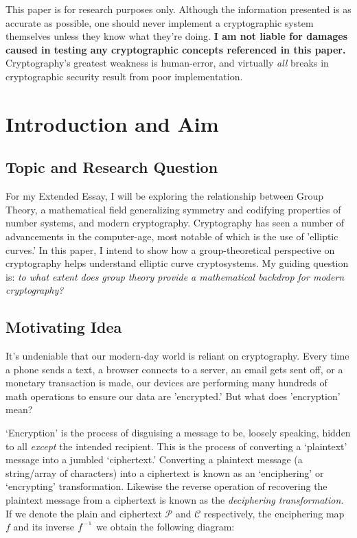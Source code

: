 \documentclass[11pt, a4paper]{report}
\newcommand{\inv}{^{\raisebox{.2em}{$\scriptscriptstyle-1$}}}
\begin{document}
This paper is for research purposes only. Although the information presented is as accurate as possible, one should never implement a cryptographic system themselves unless they know what they're doing. \textbf{I am not liable for damages caused in testing any cryptographic concepts referenced in this paper.} Cryptography's greatest weakness is human-error, and virtually \textit{all} breaks in cryptographic security result from poor implementation.\autocite{thimbleby}

\section{Introduction and Aim}
\subsection{Topic and Research Question}

For my Extended Essay, I will be exploring the relationship between Group Theory, a mathematical field generalizing symmetry and codifying properties of number systems, and modern cryptography. Cryptography has seen a number of advancements in the computer-age, most notable of which is the use of 'elliptic curves.' In this paper, I intend to show how a group-theoretical perspective on cryptography helps understand elliptic curve cryptosystems. My guiding question is: \textit{to what extent does group theory provide a mathematical backdrop for modern cryptography?}

\subsection{Motivating Idea}
It's undeniable that our modern-day world is reliant on cryptography. Every time a phone sends a text, a browser connects to a server, an email gets sent off, or a monetary transaction is made, our devices are performing many hundreds of math operations to ensure our data are 'encrypted.' But what does 'encryption' mean?

‘Encryption’ is the process of disguising a message to be, loosely speaking, hidden to all \textit{except} the intended recipient. This is the process of converting a ‘plaintext’ message into a jumbled ‘ciphertext.' Converting a plaintext message (a string/array of characters) into a ciphertext is known as an ‘enciphering’ or ‘encrypting’ transformation. Likewise the reverse operation of recovering the plaintext message from a ciphertext is known as the \textit{deciphering transformation.}\autocite[54]{koblitz} If we denote the plain and ciphertext $\mathcal{P}$ and $\mathcal{C}$ respectively, the enciphering map $f$ and its inverse $f\inv$ we obtain the following diagram:
\end{document}
